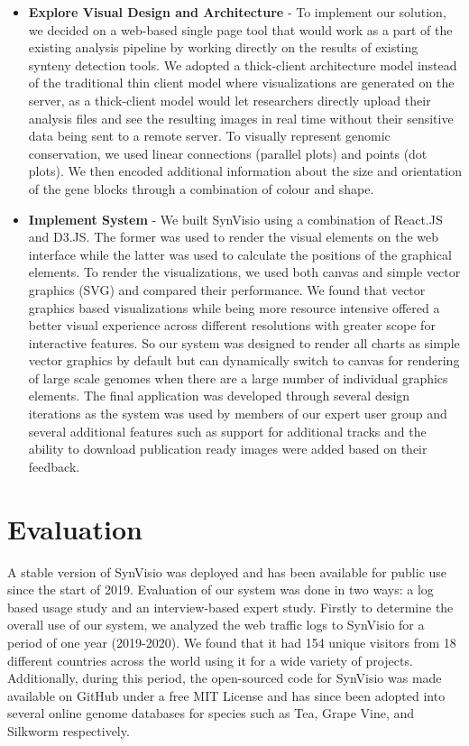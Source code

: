 \begin{itemize}
    \item \textbf{Explore Visual Design and Architecture} - 
    To implement our solution, we decided on a web-based single page tool that would work as a part of the existing analysis pipeline by working directly on the results of existing synteny detection tools. We adopted a thick-client architecture model instead of the traditional thin client model where visualizations are generated on the server, as a thick-client model would let researchers directly upload their analysis files and see the resulting images in real time without their sensitive data being sent to a remote server. To visually represent genomic conservation, we used linear connections (parallel plots) and points (dot plots). We then encoded additional information about the size and orientation of the gene blocks through a combination of colour and shape.
   
   \item \textbf{Implement System} - We built SynVisio using a combination of React.JS\cite{react} and D3.JS\cite{d3js}. The former was used to render the visual elements on the web interface while the latter was used to calculate the positions of the graphical elements. To render the visualizations, we used both canvas and simple vector graphics (SVG) and compared their performance. We found that vector graphics based visualizations while being more resource intensive offered a better visual experience across different resolutions with greater scope for interactive features. So our system was designed to render all charts as simple vector graphics by default but can dynamically switch to canvas for rendering of large scale genomes when there are a large number of individual graphics elements. The final application was developed through several design iterations as the system was used by members of our expert user group and several additional features such as support for additional tracks and the ability to download publication ready images were added based on their feedback. 

\end{itemize}

\section{Evaluation}

A stable version of SynVisio was deployed and has been available for public use since the start of 2019. Evaluation of our system was done in two ways: a log based usage study and an interview-based expert study. Firstly to determine the overall use of our system, we analyzed the web traffic logs to SynVisio for a period of one year (2019-2020). We found that it had 154 unique visitors from 18 different countries across the world using it for a wide variety of projects. Additionally, during this period, the open-sourced code for SynVisio was made available on GitHub under a free MIT License and has since been adopted into several online genome databases for species such as Tea, Grape Vine, and Silkworm respectively.

